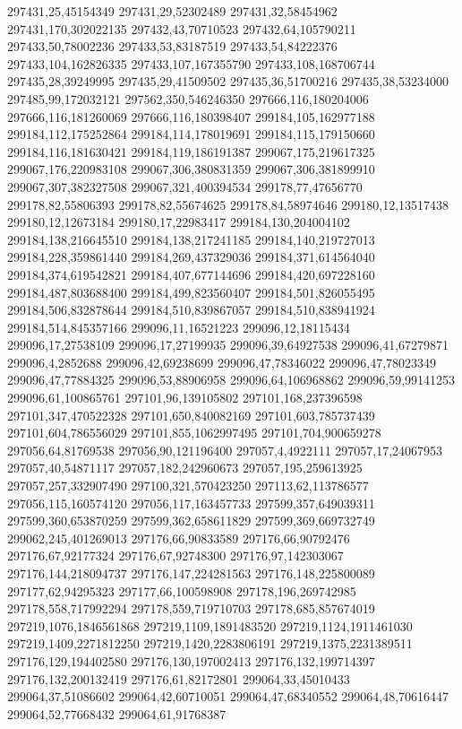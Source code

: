 297431,25,45154349
297431,29,52302489
297431,32,58454962
297431,170,302022135
297432,43,70710523
297432,64,105790211
297433,50,78002236
297433,53,83187519
297433,54,84222376
297433,104,162826335
297433,107,167355790
297433,108,168706744
297435,28,39249995
297435,29,41509502
297435,36,51700216
297435,38,53234000
297485,99,172032121
297562,350,546246350
297666,116,180204006
297666,116,181260069
297666,116,180398407
299184,105,162977188
299184,112,175252864
299184,114,178019691
299184,115,179150660
299184,116,181630421
299184,119,186191387
299067,175,219617325
299067,176,220983108
299067,306,380831359
299067,306,381899910
299067,307,382327508
299067,321,400394534
299178,77,47656770
299178,82,55806393
299178,82,55674625
299178,84,58974646
299180,12,13517438
299180,12,12673184
299180,17,22983417
299184,130,204004102
299184,138,216645510
299184,138,217241185
299184,140,219727013
299184,228,359861440
299184,269,437329036
299184,371,614564040
299184,374,619542821
299184,407,677144696
299184,420,697228160
299184,487,803688400
299184,499,823560407
299184,501,826055495
299184,506,832878644
299184,510,839867057
299184,510,838941924
299184,514,845357166
299096,11,16521223
299096,12,18115434
299096,17,27538109
299096,17,27199935
299096,39,64927538
299096,41,67279871
299096,4,2852688
299096,42,69238699
299096,47,78346022
299096,47,78023349
299096,47,77884325
299096,53,88906958
299096,64,106968862
299096,59,99141253
299096,61,100865761
297101,96,139105802
297101,168,237396598
297101,347,470522328
297101,650,840082169
297101,603,785737439
297101,604,786556029
297101,855,1062997495
297101,704,900659278
297056,64,81769538
297056,90,121196400
297057,4,4922111
297057,17,24067953
297057,40,54871117
297057,182,242960673
297057,195,259613925
297057,257,332907490
297100,321,570423250
297113,62,113786577
297056,115,160574120
297056,117,163457733
297599,357,649039311
297599,360,653870259
297599,362,658611829
297599,369,669732749
299062,245,401269013
297176,66,90833589
297176,66,90792476
297176,67,92177324
297176,67,92748300
297176,97,142303067
297176,144,218094737
297176,147,224281563
297176,148,225800089
297177,62,94295323
297177,66,100598908
297178,196,269742985
297178,558,717992294
297178,559,719710703
297178,685,857674019
297219,1076,1846561868
297219,1109,1891483520
297219,1124,1911461030
297219,1409,2271812250
297219,1420,2283806191
297219,1375,2231389511
297176,129,194402580
297176,130,197002413
297176,132,199714397
297176,132,200132419
297176,61,82172801
299064,33,45010433
299064,37,51086602
299064,42,60710051
299064,47,68340552
299064,48,70616447
299064,52,77668432
299064,61,91768387
